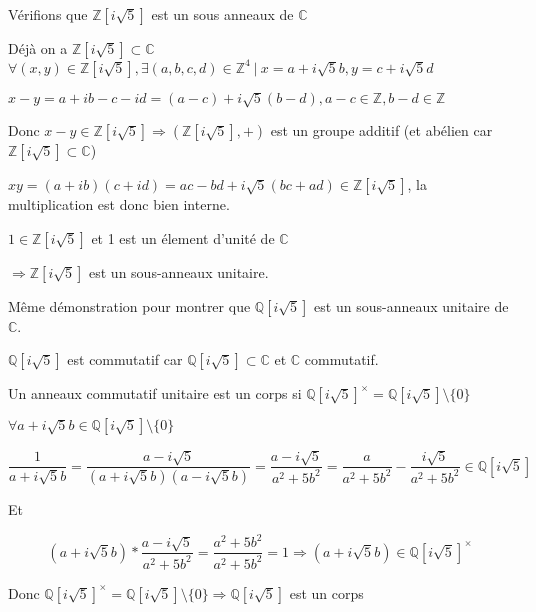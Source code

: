 
Vérifions que $\mathbb{Z}[i\sqrt{5}]$ est un sous anneaux de $\mathbb{C}$

Déjà on a $\mathbb{Z}[i\sqrt{5}] \subset \mathbb{C}$
\newline
$\forall (x, y) \in \mathbb{Z}[i\sqrt{5}], \exists (a, b, c, d) \in \mathbb{Z}^4\ |\ x = a + i\sqrt{5}b, y = c + i\sqrt{5}d$

$x - y = a + ib - c - id = (a - c) + i\sqrt{5}(b - d), a - c \in \mathbb{Z}, b - d \in \mathbb{Z}$

Donc $x - y \in \mathbb{Z}[i\sqrt{5}] \Longrightarrow (\mathbb{Z}[i\sqrt{5}], +)$ est un groupe additif (et abélien car $\mathbb{Z}[i\sqrt{5}] \subset \mathbb{C}$)

$xy = (a + ib)(c + id) = ac - bd + i\sqrt{5}(bc + ad) \in \mathbb{Z}[i\sqrt{5}]$, la multiplication est donc bien interne.

$1 \in \mathbb{Z}[i\sqrt{5}]$ et 1 est un élement d'unité de $\mathbb{C}$

$ \Longrightarrow  \mathbb{Z}[i\sqrt{5}]$ est un sous-anneaux unitaire.

$$ $$
Même démonstration pour montrer que  $\mathbb{Q}[i\sqrt{5}]$ est un sous-anneaux unitaire de $\mathbb{C}$.

$\mathbb{Q}[i\sqrt{5}]$ est commutatif car $\mathbb{Q}[i\sqrt{5}] \subset \mathbb{C}$ et $\mathbb{C}$ commutatif.


Un anneaux commutatif unitaire est un corps si $\mathbb{Q}[i\sqrt{5}]^{\times} = \mathbb{Q}[i\sqrt{5}] \setminus \{0\}$

$\forall a + i\sqrt{5}b \in \mathbb{Q}[i\sqrt{5}] \setminus \{0\}$

\[
  \frac{1}{a + i\sqrt{5}b} = \frac{a - i\sqrt{5}}{(a + i\sqrt{5}b)(a - i\sqrt{5}b)} = \frac{a - i\sqrt{5}}{a^2 + 5b^2} = \frac{a}{a^2 + 5b^2} - \frac{i\sqrt{5}}{a^2 + 5b^2} \in \mathbb{Q}[i\sqrt{5}]
\]

Et 

\[
  (a + i\sqrt{5}b)*\frac{a - i\sqrt{5}}{a^2 + 5b^2} = \frac{a^2 + 5b^2}{a^2 + 5b^2} = 1 \Longrightarrow (a + i\sqrt{5}b) \in \mathbb{Q}[i\sqrt{5}]^{\times}
\]

Donc $\mathbb{Q}[i\sqrt{5}]^{\times} = \mathbb{Q}[i\sqrt{5}] \setminus \{0\} \Longrightarrow \mathbb{Q}[i\sqrt{5}]$ est un corps
